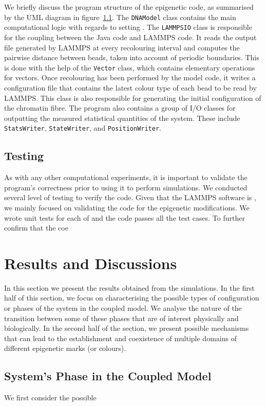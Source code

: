 \documentclass[12pt]{article}
\begin{document}
We briefly discuss the program structure of the epigenetic code, as summarised by the UML diagram in figure~\ref{}. The \texttt{DNAModel} class contains the main computational logic with regards to setting . The \texttt{LAMMPSIO} class is responsible for the coupling between the Java code and LAMMPS code. It reads the output file generated by LAMMPS at every recolouring interval and computes the pairwise distance between beads, taken into account of periodic boundaries. This is done with the help of the \texttt{Vector} class, which contains elementary operations for vectors. Once recolouring has been performed by the model code, it writes a configuration file that contains the latest colour type of each bead to be read by LAMMPS. This class is also responsible for generating the initial configuration of the chromatin fibre. The program also contains a group of I/O classes for outputting the measured statistical quantities of the system. These include \texttt{StatsWriter}, \texttt{StateWriter}, and \texttt{PositionWriter}.

\subsection{Testing}
As with any other computational experiments, it is important to validate the program's correctness prior to using it to perform simulations. We conducted several level of testing to verify the code. Given that the LAMMPS software is , we mainly focused on validating the code for the epigenetic modifications.  We wrote unit tests for each of  and the code passes all the test cases. To further confirm that the coe


\section{Results and Discussions}
In this section we present the results obtained from the simulations. In the first half of this section, we focus on characterising the possible types of configuration or phases of the system in the coupled model. We analyse the nature of the transition between some of these phases that are of interest physically and biologically. In the second half of the section, we present possible mechanisms that can lead to the establishment and coexistence of multiple domains of different epigenetic marks (or colours).

\subsection{System's Phase in the Coupled Model}
We first consider the possible 
\end{document}
